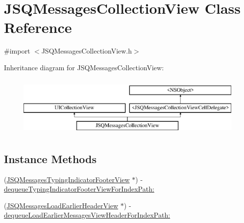 \hypertarget{interface_j_s_q_messages_collection_view}{}\section{J\+S\+Q\+Messages\+Collection\+View Class Reference}
\label{interface_j_s_q_messages_collection_view}


{\ttfamily \#import $<$J\+S\+Q\+Messages\+Collection\+View.\+h$>$}

Inheritance diagram for J\+S\+Q\+Messages\+Collection\+View\+:\begin{figure}[H]
\begin{center}
\leavevmode
\includegraphics[height=3.000000cm]{interface_j_s_q_messages_collection_view}
\end{center}
\end{figure}
\subsection*{Instance Methods}
\begin{DoxyCompactItemize}
\item 
(\hyperlink{interface_j_s_q_messages_typing_indicator_footer_view}{J\+S\+Q\+Messages\+Typing\+Indicator\+Footer\+View} $\ast$) -\/ \hyperlink{interface_j_s_q_messages_collection_view_a88ab1fcb95a2cdfd9d9a59340f199102}{dequeue\+Typing\+Indicator\+Footer\+View\+For\+Index\+Path\+:}
\item 
(\hyperlink{interface_j_s_q_messages_load_earlier_header_view}{J\+S\+Q\+Messages\+Load\+Earlier\+Header\+View} $\ast$) -\/ \hyperlink{interface_j_s_q_messages_collection_view_acc03239285b071c874653f7774faa7e0}{dequeue\+Load\+Earlier\+Messages\+View\+Header\+For\+Index\+Path\+:}
\end{DoxyCompactItemize}

